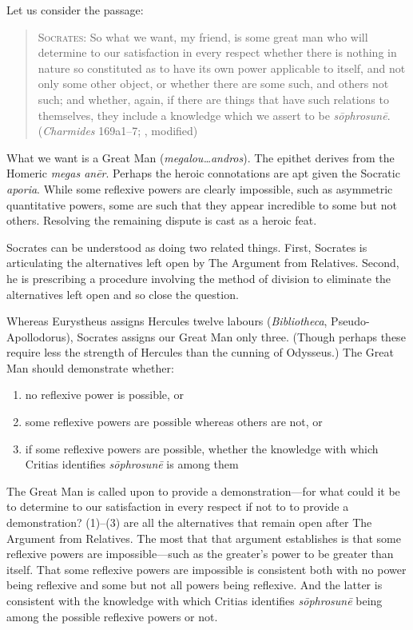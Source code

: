 Let us consider the passage:
\begin{quote}
	\textsc{Socrates}: So what we want, my friend, is some great man who will determine to our satisfaction in every respect whether there is nothing in nature so constituted as to have its own power applicable to itself, and not only some other object, or whether there are some such, and others not such; and whether, again, if there are things that have such relations to themselves, they include a knowledge which we assert to be \emph{sōphrosunē}. (\emph{Charmides} 169a1–7; \citealt[63–5]{Lamb:1927qw}, modified)
\end{quote}
What we want is a Great Man (\emph{megalou\ldots andros}). The epithet derives from the Homeric \emph{megas anēr}. Perhaps the  heroic connotations are apt given the Socratic \emph{aporia}. While some reflexive powers are clearly impossible, such as asymmetric quantitative powers, some are such that they appear incredible to some but not others. Resolving the remaining dispute is cast as a heroic feat. 

Socrates can be understood as doing two related things. First, Socrates is articulating the alternatives left open by The Argument from Relatives. Second, he is prescribing a procedure involving the method of division to eliminate the alternatives left open and so close the question.

Whereas Eurystheus assigns Hercules twelve labours (\emph{Bibliotheca}, Pseudo-Apol\-lo\-dorus), Socrates assigns our Great Man only three. (Though perhaps these require less the strength of Hercules than the cunning of Odysseus.) The Great Man should demonstrate whether:
\begin{enumerate}[(1)]
	\item no reflexive power is possible, or
	\item some reflexive powers are possible whereas others are not, or
	\item if some reflexive powers are possible, whether the knowledge with which Critias identifies \emph{sōphrosunē} is among them
\end{enumerate}
The Great Man is called upon to provide a demonstration—for what could it be to determine to our satisfaction in every respect if not to to provide a demonstration? (1)–(3) are all the alternatives that remain open after The Argument from Relatives. The most that that argument establishes is that some reflexive powers are impossible—such as the greater's power to be greater than itself. That some reflexive powers are impossible is consistent both with no power being reflexive and some but not all powers being reflexive. And the latter is consistent with the knowledge with which Critias identifies \emph{sōphrosunē} being among the possible reflexive powers or not.

